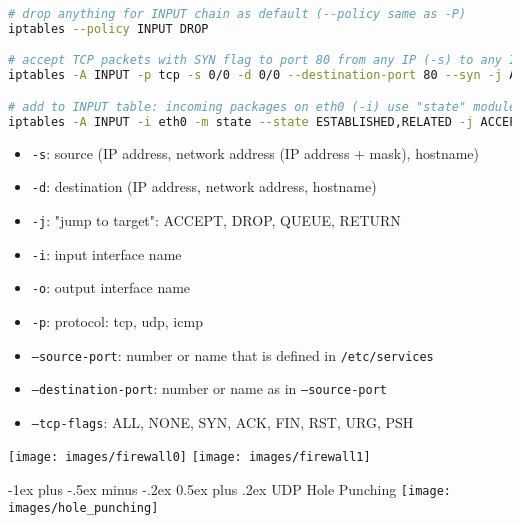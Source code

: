 \documentclass[a4paper,twocolumn]{article}
\makeatletter
\newenvironment{itemization}[1][\small]{%
    \begin{itemize}[leftmargin=*]
            #1
        }{%
    \end{itemize}
}
\renewcommand{\section}{%
    \@startsection{section}{1}{0mm}%
    {-1ex plus -.5ex minus -.2ex}%
    {0.5ex plus .2ex}%
    {\normalfont\normalsize\bfseries\sectionrule{12pt}{0.4pt}{0pt}{0pt}}
}
\makeatother
\begin{document}
\begin{footnotesize}
\begin{lstlisting}[language=bash,linewidth=\linewidth]
# drop anything for INPUT chain as default (--policy same as -P)
iptables --policy INPUT DROP

# accept TCP packets with SYN flag to port 80 from any IP (-s) to any IP (-d)
iptables -A INPUT -p tcp -s 0/0 -d 0/0 --destination-port 80 --syn -j ACCEPT

# add to INPUT table: incoming packages on eth0 (-i) use "state" module, allow only packets belonging to or related to established connections
iptables -A INPUT -i eth0 -m state --state ESTABLISHED,RELATED -j ACCEPT
\end{lstlisting}

\begin{itemization}
\item \texttt{-s}: source (IP address, network address (IP address + mask), hostname)
\item \texttt{-d}: destination (IP address, network address, hostname)
\item \texttt{-j}: "jump to target": ACCEPT, DROP, QUEUE, RETURN
\item \texttt{-i}: input interface name
\item \texttt{-o}: output interface name
\item \texttt{-p}: protocol: tcp, udp, icmp
\item \texttt{--source-port}: number or name that is defined in \texttt{/etc/services}
\item \texttt{--destination-port}: number or name as in \texttt{--source-port}
\item \texttt{--tcp-flags}: ALL, NONE, SYN, ACK, FIN, RST, URG, PSH
\end{itemization}

\texttt{[image: images/firewall0]}
\texttt{[image: images/firewall1]}

\section{UDP Hole Punching}
\texttt{[image: images/hole\_punching]}


\end{footnotesize}
\end{document}
